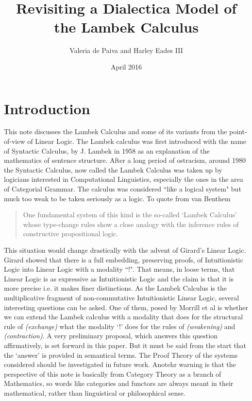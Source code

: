 \documentclass{article}
\title{Revisiting a Dialectica Model of the Lambek Calculus}
\author{Valeria de Paiva and Harley Eades III}
\date{April 2016}
\begin{document}
\maketitle

\section*{Introduction}
This   note discusses the Lambek Calculus  and some of its variants
from the point-of-view of Linear Logic.  The Lambek calculus was first introduced  with the name of Syntactic Calculus, by J. Lambek in 1958 
as an explanation of the mathematics of sentence structure. After a long period of ostracism, around 1980 the Syntactic Calculus, now called the Lambek Calculus was taken up by logicians interested in Computational Linguistics, especially the ones in the area of Categorial Grammar. The calculus was considered ``like a logical system" but much too weak
 to be taken seriously as a logic. To quote from van Benthem
 \begin{quotation}One fundamental system of this kind is the so-called `Lambek Calculus' whose type-change rules show a  close analogy with the inference rules of constructive propositional logic.
 \end{quotation}
This situation would change drastically with the advent of Girard's Linear Logic.  Girard showed that there is a full embedding, preserving proofs, of Intuitionistic Logic into Linear Logic with a modality ``!". That means, in loose terms, that Linear Logic is  as expressive as Intuitionistic Logic and the claim is that it is more precise i.e. it makes finer distinctions. As the Lambek Calculus is the multiplicative fragment of non-commutative Intuitionistic Linear Logic, several interesting questions can be asked. One of them, posed by Morrill et al  is whether we can extend the Lambek calculus with a modality that does for the structural rule of \textit{(exchange)} what the modality `!' does for the rules of \textit{(weakening)} and \textit{(contraction)}. A very preliminary proposal, which answers this question affirmatively, is set forward in this paper. But it must be said from the start that the `answer' is  provided in semantical terms. The Proof Theory of the systems considered should be investigated in future work. Anotehr warning is that the perspective of this note is basically from Category Theory as a branch of Mathematics, so words like categories and functors are always meant in their mathematical, rather than linguistical or philosophical sense.
\end{document}
